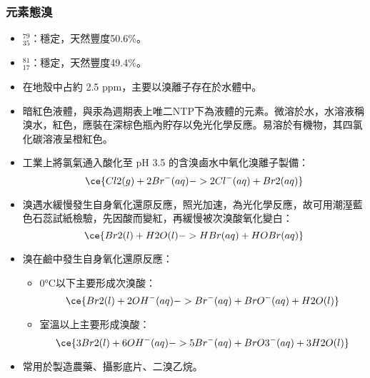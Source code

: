 \documentclass[a4paper,12pt]{report}
\begin{document}
\subsubsection{元素態溴}
\begin{itemize}
\item $^{79}_{35}$\rmBr：穩定，天然豐度50.6\%。
\item $^{81}_{17}$\rmBr：穩定，天然豐度49.4\%。
\item 在地殼中占約 2.5 ppm，主要以溴離子存在於水體中。
\item 暗紅色液體，與汞為週期表上唯二NTP下為液體的元素。微溶於水，水溶液稱溴水，紅色，應裝在深棕色瓶內貯存以免光化學反應。易溶於有機物，其四氯化碳溶液呈橙紅色。
\item 工業上將氯氣通入酸化至 pH 3.5 的含溴鹵水中氧化溴離子製備：
\[\ce{Cl2(g) + 2Br^-(aq) -> 2Cl^-(aq) + Br2(aq)}\]
\item 溴遇水緩慢發生自身氧化還原反應，照光加速，為光化學反應，故可用潮溼藍色石蕊試紙檢驗，先因酸而變紅，再緩慢被次溴酸氧化變白：
\[\ce{Br2(l) + H2O(l) -> HBr(aq) + HOBr(aq)}\]
\item 溴在鹼中發生自身氧化還原反應：
\begin{itemize}
\item 0°C以下主要形成次溴酸：
\[\ce{Br2(l) + 2OH^-(aq) -> Br^-(aq) + BrO^-(aq) + H2O(l)}\]
\item 室溫以上主要形成溴酸：
\[\ce{3Br2(l) + 6OH^-(aq) -> 5Br^-(aq) + BrO3^-(aq) + 3H2O(l)}\]
\end{itemize}
\item 常用於製造農藥、攝影底片、二溴乙烷。
\end{itemize}
\end{document}
